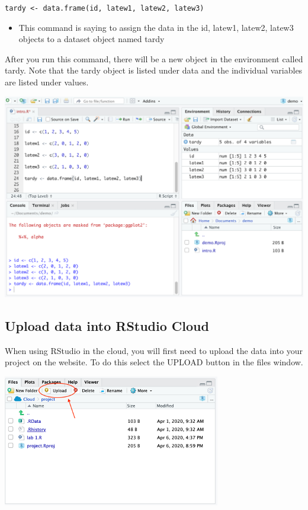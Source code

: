 \documentclass[
]{book}
\providecommand{\tightlist}{%
  \setlength{\itemsep}{0pt}\setlength{\parskip}{0pt}}
\begin{document}
\texttt{tardy\ \textless{}-\ data.frame(id,\ latew1,\ latew2,\ latew3)}

\begin{itemize}
\tightlist
\item
  This command is saying to assign the data in the id, latew1, latew2, latew3 objects to a dataset object named tardy
\end{itemize}

After you run this command, there will be a new object in the environment called tardy. Note that the tardy object is listed under data and the individual variables are listed under values.

\includegraphics{img/DATA THINGS 1R4.png}

\hypertarget{upload-data-into-rstudio-cloud}{%
\subsection{Upload data into RStudio Cloud}\label{upload-data-into-rstudio-cloud}}

When using RStudio in the cloud, you will first need to upload the data into your project on the website. To do this select the UPLOAD button in the files window.

\includegraphics{img/upload.png}
\end{document}
